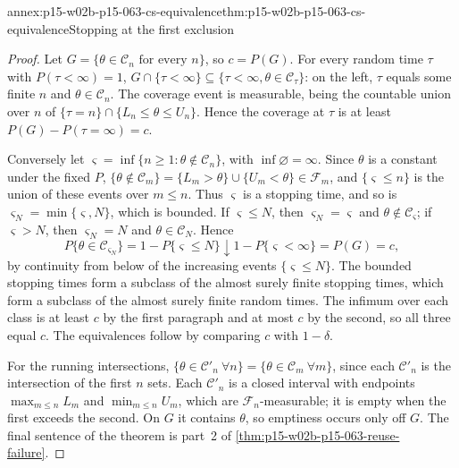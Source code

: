 \begin{annexitem}{annex:p15-w02b-p15-063-cs-equivalence}{thm:p15-w02b-p15-063-cs-equivalence}{Stopping at the first exclusion}
\begin{proof}
Let \(G=\{\theta\in\mathcal C_n\text{ for every }n\}\), so \(c=P(G)\).
For every random time \(\tau\) with \(P(\tau<\infty)=1\),
\(G\cap\{\tau<\infty\}\subseteq\{\tau<\infty,\theta\in\mathcal C_\tau\}\):
on the left, \(\tau\) equals some finite \(n\) and \(\theta\in\mathcal
C_n\). The coverage event is measurable, being the countable union over
\(n\) of \(\{\tau=n\}\cap\{L_n\leq\theta\leq U_n\}\). Hence the coverage
at \(\tau\) is at least \(P(G)-P(\tau=\infty)=c\).

Conversely let \(\varsigma=\inf\{n\geq1:\theta\notin\mathcal C_n\}\), with
\(\inf\varnothing=\infty\). Since \(\theta\) is a constant under the fixed
\(P\), \(\{\theta\notin\mathcal C_m\}=\{L_m>\theta\}\cup\{U_m<\theta\}
\in\mathcal F_m\), and \(\{\varsigma\leq n\}\) is the union of these events
over \(m\leq n\). Thus \(\varsigma\) is a stopping time, and so is
\(\varsigma_N=\min\{\varsigma,N\}\), which is bounded. If \(\varsigma\leq N\),
then \(\varsigma_N=\varsigma\) and \(\theta\notin\mathcal C_{\varsigma}\);
if \(\varsigma>N\), then \(\varsigma_N=N\) and \(\theta\in\mathcal C_N\).
Hence
\[
 P\{\theta\in\mathcal C_{\varsigma_N}\}=1-P\{\varsigma\leq N\}
   \downarrow1-P\{\varsigma<\infty\}=P(G)=c,
\]
by continuity from below of the increasing events \(\{\varsigma\leq N\}\).
The bounded stopping times form a subclass of the almost surely finite
stopping times, which form a subclass of the almost surely finite random
times. The infimum over each class is at least \(c\) by the first
paragraph and at most \(c\) by the second, so all three equal \(c\). The
equivalences follow by comparing \(c\) with \(1-\delta\).

For the running intersections,
\(\{\theta\in\mathcal C'_n\ \forall n\}=\{\theta\in\mathcal C_m\
\forall m\}\), since each \(\mathcal C'_n\) is the intersection of the
first \(n\) sets. Each \(\mathcal C'_n\) is a closed interval with
endpoints \(\max_{m\leq n}L_m\) and \(\min_{m\leq n}U_m\), which are
\(\mathcal F_n\)-measurable; it is empty when the first exceeds the second.
On \(G\) it contains \(\theta\), so emptiness occurs only off \(G\).
The final sentence of the theorem is part~2 of
\cref{thm:p15-w02b-p15-063-reuse-failure}.
\end{proof}
\end{annexitem}

